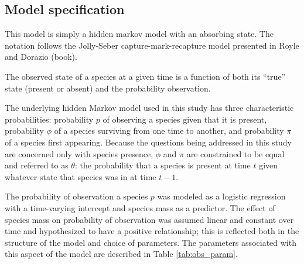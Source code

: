 \documentclass[12pt,letterpaper]{article}
\begin{document}



\subsection*{Model specification}





This model is simply a hidden markov model with an absorbing state. The notation follows the Jolly-Seber capture-mark-recapture model presented in Royle and Dorazio (book).

The observed state of a species at a given time is a function of both its ``true'' state (present or absent) and the probability observation. 



The underlying hidden Markov model used in this study has three characteristic probabilities: probability \(p\) of observing a species given that it is present, probability \(\phi\) of a species surviving from one time to another, and probability \(\pi\) of a species first appearing. Because the questions being addressed in this study are concerned only with species presence, \(\phi\) and \(\pi\) are constrained to be equal and referred to as \(\theta\): the probability that a species is present at time \(t\) given whatever state that species was in at time \(t - 1\).

The probability of observation a species \(p\) was modeled as a logistic regression with a time-varying intercept and species mass as a predictor. The effect of species mass on probability of observation was assumed linear and constant over time and hypothesized to have a positive relationship; this is reflected both in the structure of the model and choice of parameters. The parameters associated with this aspect of the model are described in Table \ref{tab:obs_param}.
\end{document}

